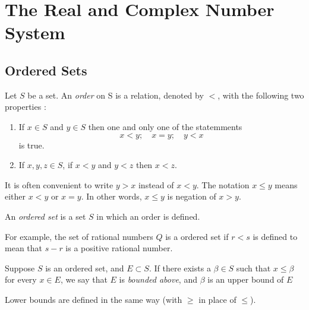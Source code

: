 

\chapter{The Real and Complex Number System}

\bigbreak
\section{Ordered Sets}

\begin{defn}
    Let $S$ be a set. An {\it order} on S is a relation, denoted by $<$, 
    with the following two properties : 
    \begin{enumerate}
        \item If $x \in S$ and $y \in S$ then one and only one of the statemments
            $$ x < y ; \quad x = y ; \quad y < x $$
            is true.
        \item If $x, y, z \in S$, if $x < y$ and $y < z$ then $x < z$.
    \end{enumerate}
    It is often convenient to write $y > x$ instead of $x < y$.
    The notation $x \leq y$ means either $x < y$ or  $x = y$. 
    In other words, $x \leq y$ is negation of $x > y$.
\end{defn}

\begin{defn}
    An {\it ordered set} is a set $S$ in which an order is defined.
\end{defn}
For example, the set of rational numbers $Q$ is a ordered set if $r < s$ 
is defined to mean that $s-r$ is a positive rational number.

\begin{defn}
    Suppose $S$ is an ordered set, and $E \subset S$. 
    If there exists a $\beta \in S$ such that $x \leq \beta$ for every $x \in E$, 
    we say that $E$ is {\it bounded above},
    and $\beta$ is an upper bound of $E$
\end{defn}
Lower bounds are defined in the same way (with $\geq$ in place of $\leq$).

